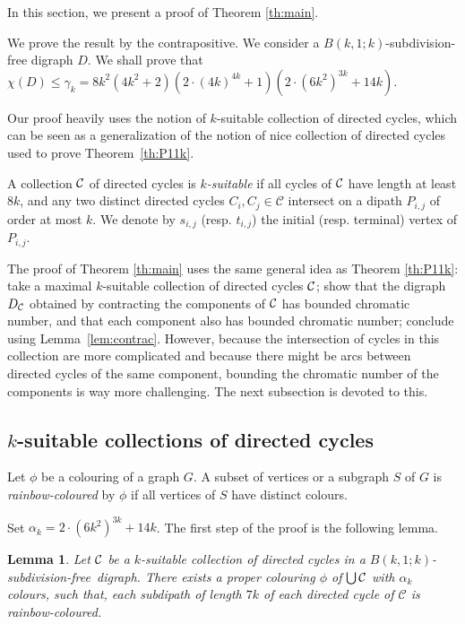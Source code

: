 \documentclass[utf8,10pt]{article}
\theoremstyle{plain}
\newtheorem{lemma}[theorem]{Lemma}
\theoremstyle{definition}
\theoremstyle{remark}
\newcommand{\cste}{ 8k^2(4k^2+2)(2\cdot (4k)^{4k} + 1) (2\cdot \col + 14k)}
\newcommand{\col}{(6k^2)^{3k}}
\newcommand{\free}{subdivision-free}
\begin{document}
In this section, we present a proof of Theorem \ref{th:main}.

We prove the result by the contrapositive. We consider a $B(k,1;k)$-subdivision-free digraph $D$.
We shall prove that $\chi(D) \leq  \gamma_k= \cste$.




Our proof heavily uses the notion of $k$-suitable collection of directed cycles, which can be seen as a generalization of the notion of nice collection of directed cycles used to prove Theorem~\ref{th:P11k}.

 
 A collection ${\cal C}$ of directed cycles is {\it $k$-suitable} if all cycles of ${\cal C}$ have length at least $8k$, and
any two distinct directed cycles $C_i,C_j\in\mathcal C$ intersect on  a dipath $P_{i,j}$ of order at most $k$.
We denote by $s_{i,j}$ (resp. $t_{i,j}$) the initial (resp. terminal) vertex of  $P_{i,j}$. 

The proof of Theorem \ref{th:main} uses the same general idea as Theorem \ref{th:P11k}: take a maximal $k$-suitable collection of directed cycles ${\cal C}$; show that the digraph $D_{\cal C}$ obtained by contracting the components of ${\cal C}$ has bounded chromatic number, and that each component also has bounded chromatic number; conclude using Lemma~\ref{lem:contrac}. However, because the intersection of cycles in this collection are more
complicated and because there might be arcs between directed cycles of the same component, bounding the chromatic number of the components is way more challenging. The next subsection is devoted to this.
 
 
 \subsection{$k$-suitable collections of directed cycles}

 Let $\phi$ be a colouring of a graph $G$. A subset of vertices or a subgraph $S$ of $G$ is {\it rainbow-coloured} by $\phi$ if all vertices of $S$ have distinct colours.

Set $\alpha_k=2\cdot \col + 14k$.
The first step of the proof is the following lemma.
 
 \begin{lemma}\label{lem:col-union-cycle}
Let ${\cal C}$ be a $k$-suitable collection of directed cycles in a $B(k,1;k)$-\free\ digraph.
There exists a proper colouring $\phi$ of $\bigcup{\cal C}$ with $\alpha_k$ colours, such that, each subdipath of length $7k$ of each directed cycle of $\mathcal{C}$ is rainbow-coloured.
\end{lemma}
 
\end{document}
